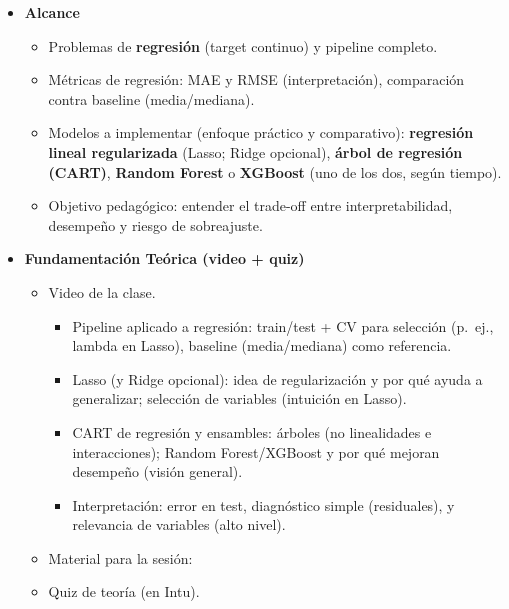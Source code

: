 \documentclass{article}
\begin{document}
\begin{itemize}
\item \textbf{Alcance}
\begin{itemize}
  \item Problemas de \textbf{regresión} (target continuo) y pipeline completo.
  \item Métricas de regresión: MAE y RMSE (interpretación), comparación contra baseline (media/mediana).
  \item Modelos a implementar (enfoque práctico y comparativo): \textbf{regresión lineal regularizada} (Lasso; Ridge opcional), \textbf{árbol de regresión (CART)}, \textbf{Random Forest} o \textbf{XGBoost} (uno de los dos, según tiempo).
  \item Objetivo pedagógico: entender el trade-off entre interpretabilidad, desempeño y riesgo de sobreajuste.
\end{itemize}

\item \textbf{Fundamentación Teórica (video + quiz)}
\begin{itemize}
  \item Video de la clase. %
  \begin{itemize}
    \item Pipeline aplicado a regresión: train/test + CV para selección (p.\ ej., lambda en Lasso), baseline (media/mediana) como referencia.
    \item Lasso (y Ridge opcional): idea de regularización y por qué ayuda a generalizar; selección de variables (intuición en Lasso).
    \item CART de regresión y ensambles: árboles (no linealidades e interacciones); Random Forest/XGBoost y por qué mejoran desempeño (visión general).
    \item Interpretación: error en test, diagnóstico simple (residuales), y relevancia de variables (alto nivel).
  \end{itemize}
  \item Material para la sesión: %
  \item Quiz de teoría (en Intu).
\end{itemize}


\end{itemize}
\end{document}

